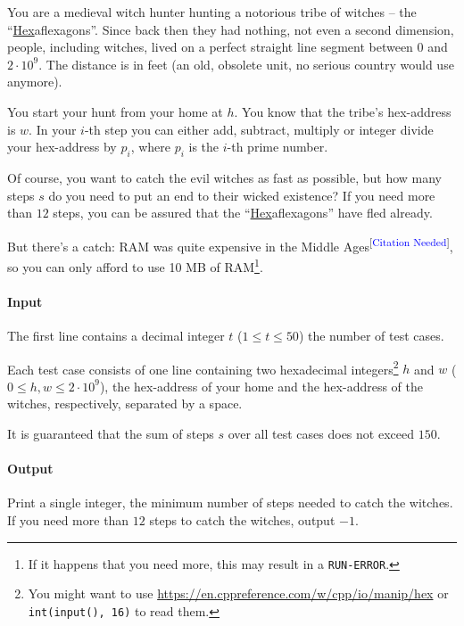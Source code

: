 
\usepackage{hyperref}



\makeheader

You are a medieval witch hunter hunting a notorious tribe of witches -- the “\underline{Hex}aflexagons”.
Since back then they had nothing, not even a second dimension, people, including witches, lived
on a perfect straight line segment between $0$ and $2 \cdot 10^9$. The distance is in feet (an old, obsolete unit,
no serious country would use anymore).

You start your hunt from your home at $h$. You know that the tribe's hex-address is $w$.
In your $i$-th step you can either add, subtract, multiply or integer divide your hex-address by $p_i$,
where $p_i$ is the $i$-th prime number.

Of course, you want to catch the evil witches as fast as possible, but
how many steps $s$ do you need to put an end to their wicked existence?
If you need more than $12$ steps, you can be assured that
the “\underline{Hex}aflexagons” have fled already.

But there's a catch:
RAM was quite expensive in the Middle Ages\textsuperscript{[\textcolor{blue}{Citation Needed}]},
so you can only afford to use 10 MB of RAM\footnote{If it happens that you need more, this may result in a \texttt{RUN-ERROR}.}.

\paragraph*{Input}

The first line contains a decimal integer $t$ ($1\leq t\leq 50$) the number of test cases.

Each test case consists of one line containing two hexadecimal integers\footnote{You might want to use \url{https://en.cppreference.com/w/cpp/io/manip/hex} or \texttt{int(input(), 16)} to read them.}
$h$ and $w$ ($0 \leq h, w \leq 2\cdot 10^9$), the hex-address of your home and the hex-address of the witches, respectively, separated by a space.

It is guaranteed that the sum of steps $s$ over all test cases does not exceed $150$.

\paragraph*{Output}

Print a single integer, the minimum number of steps needed to catch the witches.
If you need more than $12$ steps to catch the witches, output $-1$.

\begin{samples}
\end{samples}

